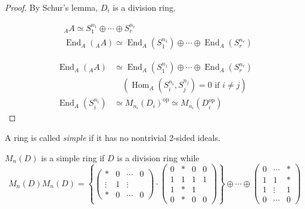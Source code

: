 \documentclass[11pt, a4paper]{report}
\begin{document}
\begin{proof}
By Schur's lemma, $D_{i}$ is a division ring.

\[
\begin{aligned}
& {}_{A}A \simeq S_{1}^{n_{1}} \oplus \cdots \oplus S_{r}^{n_{r}} \\
& \operatorname{End}_{A}({}_{A}A) \simeq \operatorname{End}_{A}\left(S_{1}^{n_{1}}\right) \oplus \cdots \oplus \operatorname{End}_{A}\left(S_{r}^{n_{r}}\right)
\end{aligned}
\]

\[
\begin{aligned}
\operatorname{End}_{A}({}_{A}A) & \simeq \operatorname{End}_{A}\left(S_{1}^{n_{1}}\right) \oplus \cdots \oplus \operatorname{End}_{A}\left(S_{r}^{n_{r}}\right) \\
& \quad \left(\operatorname{Hom}_{A}\left(S_{i}^{n_{i}}, S_{j}^{n_{j}}\right)=0 \text{ if } i \neq j\right) \\
\operatorname{End}_{A}\left(S_{i}^{n_{i}}\right) & \simeq M_{n_{i}}\left(D_{i}\right)^{\mathrm{op}} \simeq M_{n_{i}}\left(D_{i}^{\mathrm{op}}\right)
\end{aligned}
\]

\end{proof}

\begin{definition}
A ring is called \emph{simple} if it has no nontrivial 2-sided ideals.
\end{definition}

\begin{example}
$M_n(D)$ is a simple ring if $D$ is a division ring while
\[
M_n(D) M_n(D) = \left\{\begin{pmatrix} * & 0 & \cdots & 0 \\ \vdots & 1 & \vdots \\ * & 0 & \cdots & 0 \end{pmatrix} \cdot \begin{pmatrix} 0 & * & 0 & 0 \\ 1 & 1 & 1 & 1 \\ 1 & * & 1 \\ 0 & * & 0 & 0 \end{pmatrix}\right\} \oplus \cdots \oplus \begin{pmatrix} 0 & \cdots & * \\ 1 & 1 & * \\ 1 & \vdots & 1 \\ 0 & \cdots & 0 \end{pmatrix}
\]

\end{example}
\end{document}
